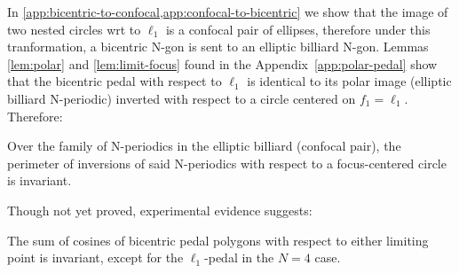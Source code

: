 
In \cref{app:bicentric-to-confocal,app:confocal-to-bicentric} we show that the image of two nested circles wrt to $\ell_1$ is a confocal pair of ellipses, therefore under this tranformation, a bicentric N-gon is sent to an elliptic billiard N-gon. Lemmas \ref{lem:polar} and \ref{lem:limit-focus} found in the Appendix~\ref{app:polar-pedal} show that the bicentric pedal with respect to $\ell_1$ is identical to its polar image (elliptic billiard N-periodic) inverted with respect to a circle centered on $f_1=\ell_1$. Therefore:

\begin{corollary}
Over the family of N-periodics in the elliptic billiard (confocal pair), the perimeter of inversions of said N-periodics with respect to a focus-centered circle is invariant. 
\label{cor:inv-per}
\end{corollary}


Though not yet proved, experimental evidence suggests:

\begin{conjecture}
The sum of cosines of bicentric pedal polygons with respect to either limiting point is invariant, except for the $\ell_1$-pedal in the $N=4$ case.
\label{conj:limiting-sum-cosines}
\end{conjecture}